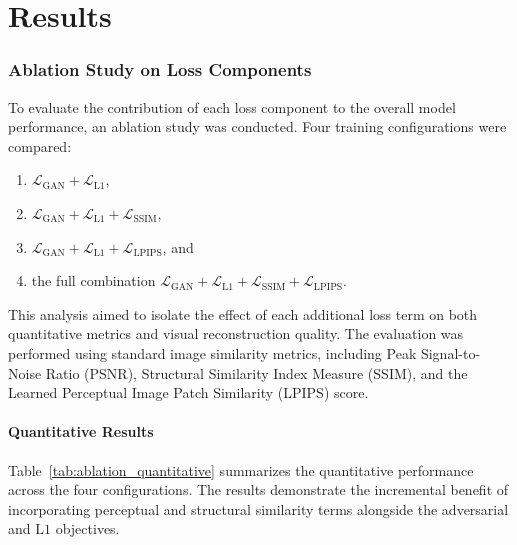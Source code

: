 \chapter{Results}
\subsection{Ablation Study on Loss Components}
\label{sec:ablation_loss}

To evaluate the contribution of each loss component to the overall model performance, an ablation study was conducted. 
Four training configurations were compared:
\begin{enumerate}
    \item $\mathcal{L}_{\text{GAN}} + \mathcal{L}_{\text{L1}}$,
    \item $\mathcal{L}_{\text{GAN}} + \mathcal{L}_{\text{L1}} + \mathcal{L}_{\text{SSIM}}$,
    \item $\mathcal{L}_{\text{GAN}} + \mathcal{L}_{\text{L1}} + \mathcal{L}_{\text{LPIPS}}$, and
    \item the full combination $\mathcal{L}_{\text{GAN}} + \mathcal{L}_{\text{L1}} + \mathcal{L}_{\text{SSIM}} + \mathcal{L}_{\text{LPIPS}}$.
\end{enumerate}

This analysis aimed to isolate the effect of each additional loss term on both quantitative metrics and visual reconstruction quality. 
The evaluation was performed using standard image similarity metrics, including Peak Signal-to-Noise Ratio (PSNR), Structural Similarity Index Measure (SSIM), and the Learned Perceptual Image Patch Similarity (LPIPS) score.

\subsubsection*{Quantitative Results}
Table~\ref{tab:ablation_quantitative} summarizes the quantitative performance across the four configurations. 
The results demonstrate the incremental benefit of incorporating perceptual and structural similarity terms alongside the adversarial and $\mathrm{L1}$ objectives.

